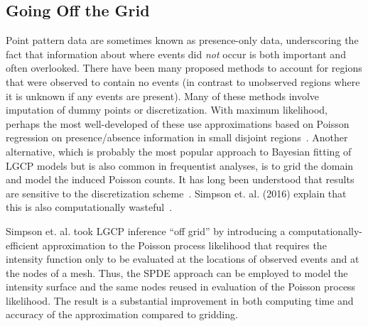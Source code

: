 \documentclass{interact}
\begin{document}
\subsection{Going Off the Grid}
\label{offgrid}

Point pattern data are sometimes known as presence-only data, underscoring
the fact that information about where events did \emph{not} occur is both
important and often overlooked. There have been many proposed methods to
account for regions that were observed to contain no events (in contrast to
unobserved regions where it is unknown if any events are present). Many of
these methods involve imputation of dummy points or discretization. With maximum likelihood, perhaps the most well-developed of these use
approximations based on Poisson regression on presence/absence information in
small disjoint regions~\cite{bermanturner,baddeleyturner}. Another alternative, 
which is probably the most popular approach to Bayesian
fitting of LGCP models but is also common in frequentist analyses, is to grid
the domain and model the induced Poisson counts. It has long been understood
that results are sensitive to the discretization scheme~\cite{brixmoeller}.
Simpson et. al. (2016) explain that this is also computationally
wasteful~\cite{simpsonetal}.

Simpson et. al. took LGCP inference ``off grid'' by introducing a
computationally-efficient approximation to the Poisson process likelihood that
requires the intensity function only to be evaluated at the locations of
observed events and at the nodes of a mesh. Thus, the SPDE approach can be
employed to model the intensity surface and the same nodes reused in
evaluation of the Poisson process likelihood. The result is a substantial
improvement in both computing time and accuracy of the approximation compared
to gridding.
\end{document}
